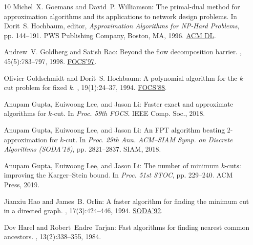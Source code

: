 \documentclass[11pt]{article}
\numberwithin{equation}{section}
\theoremstyle{definition}
\theoremstyle{plain}
\begin{document}
\begin{thebibliography}{10}
{\sc Michel~X. Goemans and David~P. Williamson}: The primal-dual method for
  approximation algorithms and its applications to network design problems.
\newblock In {\sc Dorit~S. Hochbaum}, editor, {\em Approximation Algorithms for
  {NP}-Hard Problems}, pp. 144--191. PWS Publishing Company, Boston, MA, 1996.
\newblock \href{https://dl.acm.org/doi/10.5555/241938.241942}{ACM DL}.

{\sc Andrew~V. Goldberg and Satish Rao}: Beyond the flow decomposition barrier.
, 45(5):783--797, 1998.
\newblock \prelim \href{https://doi.org/10.1109/SFCS.1997.646087}{FOCS'97}.
\newblock [\epfmtdoi{10.1145/290179.290181}]

{\sc Olivier Goldschmidt and Dorit~S. Hochbaum}: A polynomial algorithm for the
  $k$-cut problem for fixed $k$.
, 19(1):24--37, 1994.
\newblock \prelim \href{https://doi.org/10.1109/SFCS.1988.21960}{FOCS'88}.

{\sc Anupam Gupta, Euiwoong Lee, and Jason Li}: Faster exact and approximate
  algorithms for $k$-cut.
\newblock In {\em Proc. 59th FOCS}. IEEE Comp. Soc., 2018.

{\sc Anupam Gupta, Euiwoong Lee, and Jason Li}: An {FPT} algorithm beating
  2-approximation for $k$-cut.
\newblock In {\em Proc. 29th Ann. ACM--SIAM Symp. on Discrete Algorithms
  (SODA'18)}, pp. 2821--2837. SIAM, 2018.

{\sc Anupam Gupta, Euiwoong Lee, and Jason Li}: The number of minimum $k$-cuts:
  improving the {Karger}--{Stein} bound.
\newblock In {\em Proc. 51st STOC}, pp. 229--240. ACM Press, 2019.

{\sc Jianxiu Hao and James~B. Orlin}: A faster algorithm for finding the
  minimum cut in a directed graph.
, 17(3):424--446, 1994.
\newblock \prelim \href{https://dl.acm.org/doi/10.5555/139404.139439}{SODA'92}.

{\sc Dov Harel and Robert~Endre Tarjan}: Fast algorithms for finding nearest
  common ancestors.
, 13(2):338--355, 1984.
\newblock [\epfmtdoi{10.1137/0213024}]


\end{thebibliography}
\end{document}
